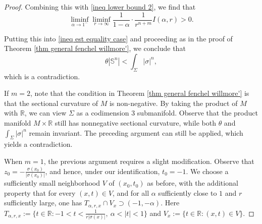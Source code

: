 \documentclass[10pt,a4paper]{amsart}
\begin{document}
\begin{proof}
Combining this with \eqref{ineq lower bound 2}, we find that
$$
\liminf_{\alpha \rightarrow 1^{-}} \liminf_{r \rightarrow \infty}
\frac{1}{1-\alpha}\cdot \frac{1}{r^{n+m}} I(\alpha, r) > 0.
$$

Putting this into \eqref{ineq est equality case} and proceeding as in the proof of Theorem \ref{thm general fenchel willmore'}, we conclude that
$$
\theta|\mathbb S^{n}|< \int_{\Sigma} |\sigma|^{n},
$$
which is a contradiction.

If $m=2$, note that the condition in Theorem \ref{thm general fenchel willmore'} is that the sectional curvature of $M$ is non-negative. By taking the product of $M$ with $\mathbb{R}$, we can view $\Sigma$ as a codimension $3$ submanifold. Observe that the product manifold $M \times \mathbb{R}$ still has nonnegative sectional curvature, while both $\theta$ and $\int_{\Sigma}|\sigma|^n$ remain invariant. The preceding argument can still be applied, which yields a contradiction.

When $m = 1$, the previous argument requires a slight modification. Observe that $z_0 = -\frac{\sigma(x_0)}{|\sigma(x_0)|}$, and hence, under our identification, $t_0 = -1$. We choose a sufficiently small neighborhood $V$ of $(x_0, t_0)$ as before, with the additional property that for every $(x, t)\in V$, and for all $\alpha$ sufficiently close to $1$ and $r$ sufficiently large, one has $T_{\alpha, r, x}\cap V_x \supset (-1, -\alpha)$. Here $T_{\alpha, r, x}:= \{ t \in \mathbb{R}: -1 < t < \tfrac{1}{r|\sigma(x)|}, \ \alpha < |t| < 1 \}$ and $V_x:= \{ t \in \mathbb{R}: (x, t)\in V \}$.


\end{proof}
\end{document}
